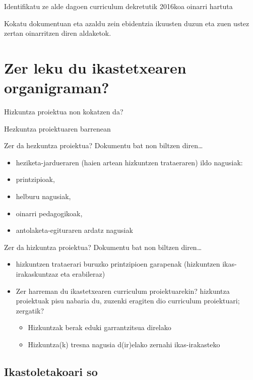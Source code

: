\documentclass[
]{book}
\providecommand{\tightlist}{%
  \setlength{\itemsep}{0pt}\setlength{\parskip}{0pt}}
\begin{document}
Identifikatu ze alde dagoen curriculum dekretutik 2016koa oinarri hartuta

Kokatu dokumentuan eta azaldu zein ebidentzia ikuusten duzun eta zuen ustez zertan oinarritzen diren aldaketok.

\hypertarget{zer-leku-du-ikastetxearen-organigraman}{%
\section{Zer leku du ikastetxearen organigraman?}\label{zer-leku-du-ikastetxearen-organigraman}}

Hizkuntza proiektua non kokatzen da?

Hezkuntza proiektuaren barrenean

Zer da hezkuntza proiektua? Dokumentu bat non biltzen diren\ldots{}

\begin{itemize}
\tightlist
\item
  heziketa-jardueraren (haien artean hizkuntzen trataeraren) ildo nagusiak:
\item
  printzipioak,
\item
  helburu nagusiak,
\item
  oinarri pedagogikoak,
\item
  antolaketa-egituraren ardatz nagusiak
\end{itemize}

Zer da hizkuntza proiektua? Dokumentu bat non biltzen diren\ldots{}

\begin{itemize}
\tightlist
\item
  hizkuntzen trataerari buruzko printzipioen garapenak (hizkuntzen ikas-irakaskuntzaz eta erabileraz)
\item
  Zer harreman du ikastetxearen curriculum proiektuarekin?
  hizkuntza proiektuak pisu nabaria du, zuzenki eragiten dio curriculum proiektuari; zergatik?

  \begin{itemize}
  \tightlist
  \item
    Hizkuntzak berak eduki garrantzitsua direlako
  \item
    Hizkuntza(k) tresna nagusia d(ir)elako zernahi ikas-irakasteko
  \end{itemize}
\end{itemize}

\hypertarget{ikastoletakoari-so}{%
\subsection{Ikastoletakoari so}\label{ikastoletakoari-so}}
\end{document}
